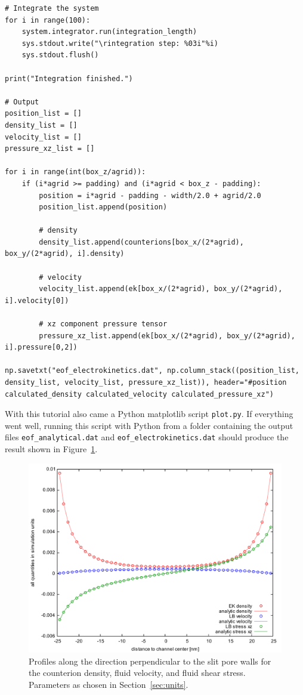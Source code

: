\begin{lstlisting}[firstnumber=66]
# Integrate the system
for i in range(100):
    system.integrator.run(integration_length)
    sys.stdout.write("\rintegration step: %03i"%i)
    sys.stdout.flush()

print("Integration finished.")

# Output
position_list = []
density_list = []
velocity_list = []
pressure_xz_list = []

for i in range(int(box_z/agrid)):
    if (i*agrid >= padding) and (i*agrid < box_z - padding):
        position = i*agrid - padding - width/2.0 + agrid/2.0
        position_list.append(position)

        # density
        density_list.append(counterions[box_x/(2*agrid), box_y/(2*agrid), i].density)

        # velocity
        velocity_list.append(ek[box_x/(2*agrid), box_y/(2*agrid), i].velocity[0])

        # xz component pressure tensor
        pressure_xz_list.append(ek[box_x/(2*agrid), box_y/(2*agrid), i].pressure[0,2])

np.savetxt("eof_electrokinetics.dat", np.column_stack((position_list, density_list, velocity_list, pressure_xz_list)), header="#position calculated_density calculated_velocity calculated_pressure_xz")
\end{lstlisting}

With this tutorial also came a Python matplotlib script \texttt{plot.py}. If everything went well, running this script with Python from a folder containing the output files \texttt{eof\_analytical.dat} and \texttt{eof\_electrokinetics.dat} should produce the result shown in Figure~\ref{fig:result}.

\begin{figure}[h]
  \begin{center}
  \includegraphics[width=1.0\columnwidth]{figures/profiles.pdf}
  \end{center}
  \caption{\label{fig:result}Profiles along the direction perpendicular to the slit pore walls for the counterion density, fluid velocity, and fluid shear stress. Parameters as chosen in Section~\ref{sec:units}.}
\end{figure}
